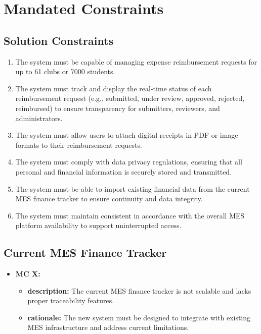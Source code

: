 \documentclass[12pt]{article}
\begin{document}
\section{Mandated Constraints}


\subsection{Solution Constraints}
  \begin{enumerate}
    \item The system must be capable of managing expense reimbursement requests for up to 61 clubs or 7000 students.
    \item The system must track and display the real-time status of each reimbursement request (e.g., submitted, under review, approved, rejected, reimbursed) to ensure transparency for submitters, reviewers, and administrators.
    \item The system must allow users to attach digital receipts in PDF or image formats to their reimbursement requests.
    \item The system must comply with data privacy regulations, ensuring that all personal and financial information is securely stored and transmitted.
    \item The system must be able to import existing financial data from the current MES finance tracker to ensure continuity and data integrity.
    \item The system must maintain consistent in accordance with the overall MES platform availability to support uninterrupted access.
  \end{enumerate}

\subsection{Current MES Finance Tracker}
  \begin{itemize}
    \item \textbf{MC X:}
      \begin{itemize}[label=$\circ$]
        \item \textbf{description:} The current MES finance tracker is not scalable and lacks proper traceability features.
        \item \textbf{rationale:} The new system must be designed to integrate with existing MES infrastructure and address current limitations.
      \end{itemize}
  \end{itemize}
\end{document}
